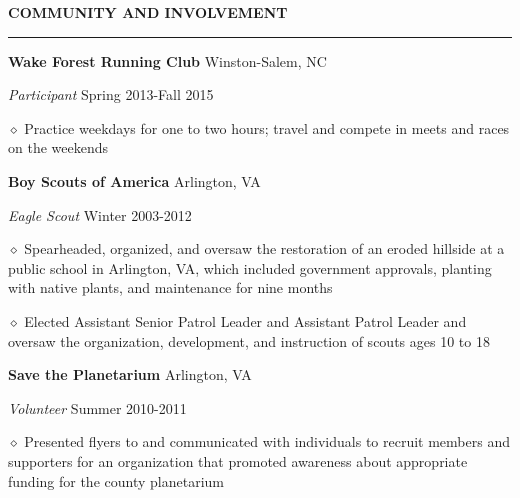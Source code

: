 \documentclass[executivepaper]{extarticle}
\begin{document}
\begin{center}
{\begin{minipage}{7.0in}

{\noindent \textbf{\fontsize{10}{9}\selectfont COMMUNITY AND INVOLVEMENT}}

\vspace{-3mm}

\noindent \rule{\textwidth}{0.5pt}

\vspace{-1mm}

{\noindent \textbf{\fontsize{9}{8}\selectfont Wake Forest Running Club}} {\hfill \fontsize{9}{8}\selectfont Winston-Salem, NC}

{\noindent \textit{\fontsize{9}{8}\selectfont Participant}} {\hfill \fontsize{9}{8}\selectfont Spring 2013-Fall 2015}

{\noindent $\diamond$ {\fontsize{9}{8}\selectfont Practice weekdays for one to two hours; travel and compete in meets and races on the weekends}}

{\noindent \textbf{\fontsize{9}{8}\selectfont Boy Scouts of America}} {\hfill \fontsize{9}{8}\selectfont Arlington, VA}

{\noindent \textit{\fontsize{9}{8}\selectfont Eagle Scout}} {\hfill \fontsize{9}{8}\selectfont Winter 2003-2012}

{\noindent $\diamond$ {\fontsize{9}{8}\selectfont Spearheaded, organized, and oversaw the restoration of an eroded hillside at a public school in Arlington, VA, which included government
approvals, planting with native plants, and maintenance for nine months}}

{\noindent $\diamond$ {\fontsize{9}{8}\selectfont Elected Assistant Senior Patrol Leader and Assistant Patrol Leader and oversaw the organization, development, and instruction of scouts ages 10 to 18}}

{\noindent \textbf{\fontsize{9}{8}\selectfont Save the Planetarium}} {\hfill \fontsize{9}{8}\selectfont Arlington, VA}

{\noindent \textit{\fontsize{9}{8}\selectfont Volunteer}} {\hfill \fontsize{9}{8}\selectfont Summer 2010-2011}

{\noindent $\diamond$ {\fontsize{9}{8}\selectfont Presented flyers to and communicated with individuals to recruit members and supporters for an organization that promoted awareness about appropriate funding
for the county planetarium}}

\vspace{3mm}


\end{minipage}}
\end{center}
\end{document}
